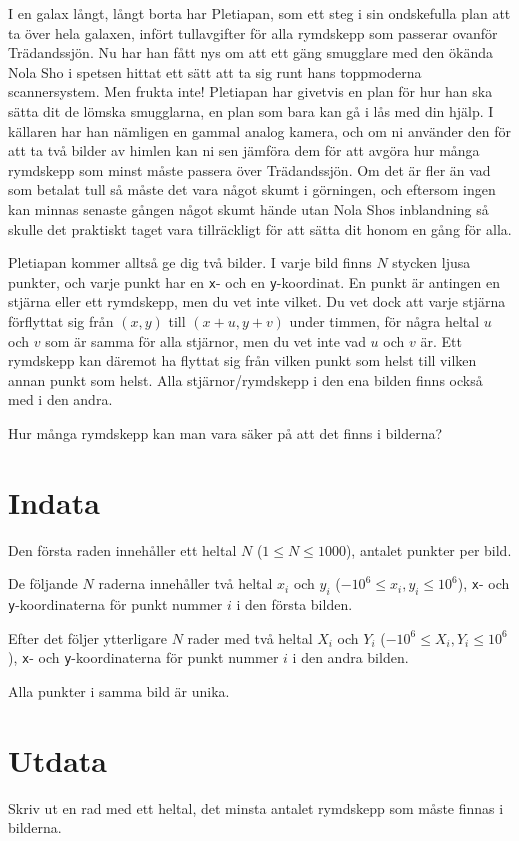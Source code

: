 I en galax långt, långt borta har Pletiapan, som ett steg i sin ondskefulla plan att ta över hela galaxen, infört tullavgifter för alla rymdskepp som passerar ovanför Trädandssjön.
Nu har han fått nys om att ett gäng smugglare med den ökända Nola Sho i spetsen hittat ett sätt att ta sig runt hans toppmoderna scannersystem.
Men frukta inte! Pletiapan har givetvis en plan för hur han ska sätta dit de lömska smugglarna, en plan som bara kan gå i lås med din hjälp.
I källaren har han nämligen en gammal analog kamera, och om ni använder den för att ta två bilder av himlen kan ni sen jämföra dem för att avgöra hur många rymdskepp som minst måste passera över Trädandssjön.
Om det är fler än vad som betalat tull så måste det vara något skumt i görningen, och eftersom ingen kan minnas senaste gången något skumt hände utan Nola Shos inblandning så skulle det praktiskt taget vara tillräckligt för att sätta dit honom en gång för alla.

Pletiapan kommer alltså ge dig två bilder. I varje bild finns $N$ stycken ljusa punkter, och varje punkt har en \texttt{x}- och en \texttt{y}-koordinat.
En punkt är antingen en stjärna eller ett rymdskepp, men du vet inte vilket.
Du vet dock att varje stjärna förflyttat sig från $(x, y)$ till $(x + u, y + v)$ under timmen, för några heltal $u$ och $v$ som är samma för alla stjärnor, men du vet inte vad $u$ och $v$ är.
Ett rymdskepp kan däremot ha flyttat sig från vilken punkt som helst till vilken annan punkt
som helst. Alla stjärnor/rymdskepp i den ena bilden finns också med i den andra.

Hur många rymdskepp kan man vara säker på att det finns i bilderna?

\section*{Indata}
Den första raden innehåller ett heltal $N$ ($1 \leq N \leq 1000$), antalet punkter per bild.

De följande $N$ raderna innehåller två heltal $x_i$ och $y_i$ ($-10^6 \leq x_i, y_i \leq 10^6$),
\texttt{x}- och \texttt{y}-koordinaterna för punkt nummer $i$ i den första bilden.

Efter det följer ytterligare $N$ rader med två heltal $X_i$ och $Y_i$ ($-10^6 \leq X_i, Y_i \leq 10^6$),
\texttt{x}- och \texttt{y}-koordinaterna för punkt nummer $i$ i den andra bilden.

Alla punkter i samma bild är unika.

\section*{Utdata}
Skriv ut en rad med ett heltal, det minsta antalet rymdskepp som måste finnas i bilderna.

